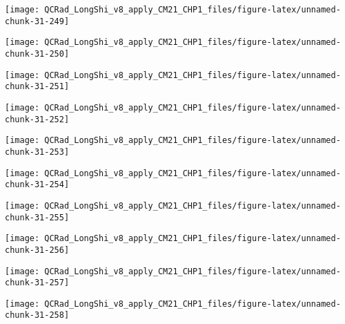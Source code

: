\documentclass[
  10pt,
  a4paper,oneside]{article}
\begin{document}
\begin{center}\texttt{[image: QCRad\_LongShi\_v8\_apply\_CM21\_CHP1\_files/figure-latex/unnamed-chunk-31-249]} \end{center}

\begin{center}\texttt{[image: QCRad\_LongShi\_v8\_apply\_CM21\_CHP1\_files/figure-latex/unnamed-chunk-31-250]} \end{center}

\begin{center}\texttt{[image: QCRad\_LongShi\_v8\_apply\_CM21\_CHP1\_files/figure-latex/unnamed-chunk-31-251]} \end{center}

\begin{center}\texttt{[image: QCRad\_LongShi\_v8\_apply\_CM21\_CHP1\_files/figure-latex/unnamed-chunk-31-252]} \end{center}

\begin{center}\texttt{[image: QCRad\_LongShi\_v8\_apply\_CM21\_CHP1\_files/figure-latex/unnamed-chunk-31-253]} \end{center}

\begin{center}\texttt{[image: QCRad\_LongShi\_v8\_apply\_CM21\_CHP1\_files/figure-latex/unnamed-chunk-31-254]} \end{center}

\begin{center}\texttt{[image: QCRad\_LongShi\_v8\_apply\_CM21\_CHP1\_files/figure-latex/unnamed-chunk-31-255]} \end{center}

\begin{center}\texttt{[image: QCRad\_LongShi\_v8\_apply\_CM21\_CHP1\_files/figure-latex/unnamed-chunk-31-256]} \end{center}

\begin{center}\texttt{[image: QCRad\_LongShi\_v8\_apply\_CM21\_CHP1\_files/figure-latex/unnamed-chunk-31-257]} \end{center}

\begin{center}\texttt{[image: QCRad\_LongShi\_v8\_apply\_CM21\_CHP1\_files/figure-latex/unnamed-chunk-31-258]} \end{center}
\end{document}
